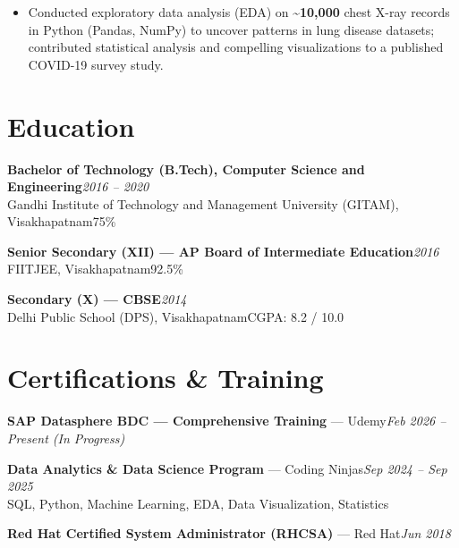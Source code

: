 \documentclass[10pt, letterpaper]{article}
\begin{document}
\begin{itemize}
  \item Conducted exploratory data analysis (EDA) on \textbf{\textasciitilde10,000} chest X-ray records in Python (Pandas, NumPy) to uncover patterns in lung disease datasets; contributed statistical analysis and compelling visualizations to a published COVID-19 survey study.
\end{itemize}

\section{Education}

{\bfseries Bachelor of Technology (B.Tech), Computer Science and Engineering}\hfill{\small\color{muted}\textit{2016 -- 2020}}\\
{\small\color{muted}Gandhi Institute of Technology and Management University (GITAM), Visakhapatnam\hfill 75\%}

\vspace{2pt}
{\bfseries Senior Secondary (XII) --- AP Board of Intermediate Education}\hfill{\small\color{muted}\textit{2016}}\\
{\small\color{muted}FIITJEE, Visakhapatnam\hfill 92.5\%}

\vspace{2pt}
{\bfseries Secondary (X) --- CBSE}\hfill{\small\color{muted}\textit{2014}}\\
{\small\color{muted}Delhi Public School (DPS), Visakhapatnam\hfill CGPA: 8.2 / 10.0}

\section{Certifications \& Training}

{\bfseries SAP Datasphere BDC --- Comprehensive Training} --- Udemy\hfill{\small\color{muted}\textit{Feb 2026 -- Present \emph{(In Progress)}}}

\vspace{1pt}
{\bfseries Data Analytics \& Data Science Program} --- Coding Ninjas\hfill{\small\color{muted}\textit{Sep 2024 -- Sep 2025}}\\
{\small\color{muted}SQL, Python, Machine Learning, EDA, Data Visualization, Statistics}

\vspace{1pt}
{\bfseries Red Hat Certified System Administrator (RHCSA)} --- Red Hat\hfill{\small\color{muted}\textit{Jun 2018}}

\end{document}
